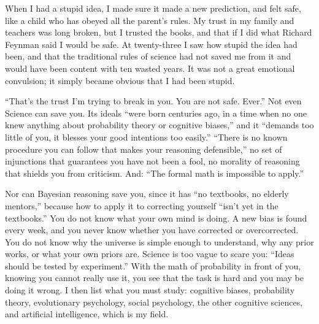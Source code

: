 When I had a stupid idea, I made sure it made a new prediction, and felt safe, like a child who has obeyed all the parent's rules. My trust in my family and teachers was long broken, but I trusted the books, and that if I did what Richard Feynman said I would be safe. At twenty-three I saw how stupid the idea had been, and that the traditional rules of science had not saved me from it and would have been content with ten wasted years. It was not a great emotional convulsion; it simply became obvious that I had been stupid. 

``That's the trust I'm trying to break in you. You are not safe. Ever.'' Not even Science can save you. Its ideals ``were born centuries ago, in a time when no one knew anything about probability theory or cognitive biases,'' and it ``demands too little of you, it blesses your good intentions too easily.'' ``There is no known procedure you can follow that makes your reasoning defensible,'' no set of injunctions that guarantees you have not been a fool, no morality of reasoning that shields you from criticism. And: ``The formal math is impossible to apply.'' 

Nor can Bayesian reasoning save you, since it has ``no textbooks, no elderly mentors,'' because how to apply it to correcting yourself ``isn't yet in the textbooks.'' You do not know what your own mind is doing. A new bias is found every week, and you never know whether you have corrected or overcorrected. You do not know why the universe is simple enough to understand, why any prior works, or what your own priors are. Science is too vague to scare you: ``Ideas should be tested by experiment.'' With the math of probability in front of you, knowing you cannot really use it, you see that the task is hard and you may be doing it wrong. I then list what you must study: cognitive biases, probability theory, evolutionary psychology, social psychology, the other cognitive sciences, and artificial intelligence, which is my field.

